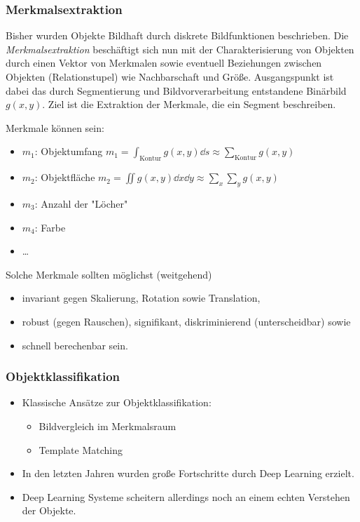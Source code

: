 			\subsubsection{Merkmalsextraktion}
				Bisher wurden Objekte Bildhaft durch diskrete Bildfunktionen beschrieben. Die \emph{Merkmalsextraktion} beschäftigt sich nun mit der Charakterisierung von Objekten durch einen Vektor von Merkmalen sowie eventuell Beziehungen zwischen Objekten (Relationstupel) wie Nachbarschaft und Größe. Ausgangspunkt ist dabei das durch Segmentierung und Bildvorverarbeitung entstandene Binärbild \( g(x, y) \). Ziel ist die Extraktion der Merkmale, die ein Segment beschreiben.
				
				Merkmale können \zB sein:
				\begin{itemize}
					\item \(m_1\): Objektumfang \( m_1 = \int_\text{Kontur} \! g(x, y) \dd{s} \approx \sum_\text{Kontur} g(x, y) \)
					\item \(m_2\): Objektfläche \( m_2 = \iint \! g(x, y) \dd{x} \dd{y} \approx \sum_x \sum_y g(x, y) \)
					\item \(m_3\): Anzahl der "Löcher"
					\item \(m_4\): Farbe
					\item \dots
				\end{itemize}
				Solche Merkmale sollten möglichst (weitgehend)
				\begin{itemize}
					\item invariant gegen Skalierung, Rotation sowie Translation,
					\item robust (gegen Rauschen), signifikant, diskriminierend (unterscheidbar) sowie
					\item schnell berechenbar sein.
				\end{itemize}

			\subsubsection{Objektklassifikation}
				\begin{itemize}
					\item Klassische Ansätze zur Objektklassifikation:
						\begin{itemize}
							\item Bildvergleich im Merkmalsraum
							\item Template Matching
						\end{itemize}
					\item In den letzten Jahren wurden große Fortschritte durch Deep Learning erzielt.
					\item Deep Learning Systeme scheitern allerdings noch an einem echten Verstehen der Objekte.
				\end{itemize}
			
